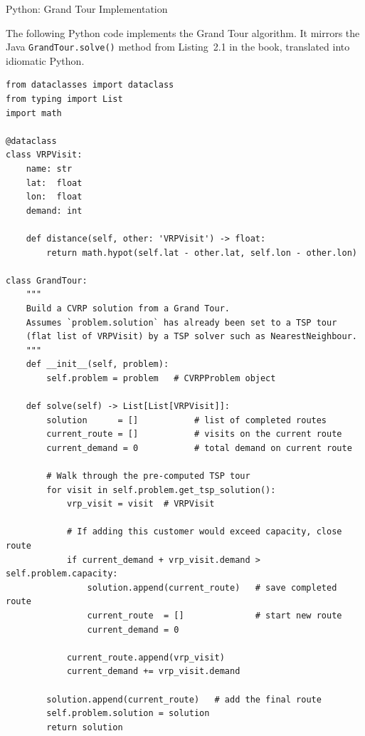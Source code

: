 \documentclass[aspectratio=169,10pt]{beamer}
\begin{document}
\begin{frame}[fragile]{Python: Grand Tour Implementation}

  The following Python code implements the Grand Tour algorithm.  It mirrors
  the Java \texttt{GrandTour.solve()} method from Listing~2.1 in the book,
  translated into idiomatic Python.

\begin{lstlisting}[caption={Grand Tour CVRP solver (Python)}]
from dataclasses import dataclass
from typing import List
import math

@dataclass
class VRPVisit:
    name: str
    lat:  float
    lon:  float
    demand: int

    def distance(self, other: 'VRPVisit') -> float:
        return math.hypot(self.lat - other.lat, self.lon - other.lon)

class GrandTour:
    """
    Build a CVRP solution from a Grand Tour.
    Assumes `problem.solution` has already been set to a TSP tour
    (flat list of VRPVisit) by a TSP solver such as NearestNeighbour.
    """
    def __init__(self, problem):
        self.problem = problem   # CVRPProblem object

    def solve(self) -> List[List[VRPVisit]]:
        solution      = []           # list of completed routes
        current_route = []           # visits on the current route
        current_demand = 0           # total demand on current route

        # Walk through the pre-computed TSP tour
        for visit in self.problem.get_tsp_solution():
            vrp_visit = visit  # VRPVisit

            # If adding this customer would exceed capacity, close route
            if current_demand + vrp_visit.demand > self.problem.capacity:
                solution.append(current_route)   # save completed route
                current_route  = []              # start new route
                current_demand = 0

            current_route.append(vrp_visit)
            current_demand += vrp_visit.demand

        solution.append(current_route)   # add the final route
        self.problem.solution = solution
        return solution
\end{lstlisting}

\end{frame}
\end{document}
